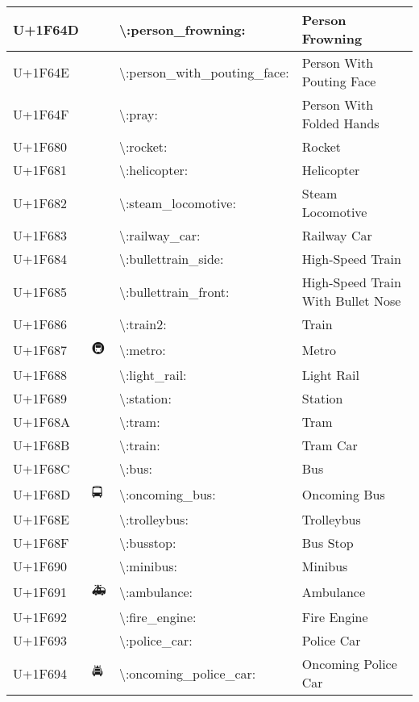 \begin{table}[h]
\begin{tabulary}{\linewidth}{|L|L|L|L|}
U+1F64D & 🙍 & {\textbackslash}:person\_frowning: & Person Frowning \\
\hline
U+1F64E & 🙎 & {\textbackslash}:person\_with\_pouting\_face: & Person With Pouting Face \\
\hline
U+1F64F & 🙏 & {\textbackslash}:pray: & Person With Folded Hands \\
\hline
U+1F680 & 🚀 & {\textbackslash}:rocket: & Rocket \\
\hline
U+1F681 & 🚁 & {\textbackslash}:helicopter: & Helicopter \\
\hline
U+1F682 & 🚂 & {\textbackslash}:steam\_locomotive: & Steam Locomotive \\
\hline
U+1F683 & 🚃 & {\textbackslash}:railway\_car: & Railway Car \\
\hline
U+1F684 & 🚄 & {\textbackslash}:bullettrain\_side: & High-Speed Train \\
\hline
U+1F685 & 🚅 & {\textbackslash}:bullettrain\_front: & High-Speed Train With Bullet Nose \\
\hline
U+1F686 & 🚆 & {\textbackslash}:train2: & Train \\
\hline
U+1F687 & 🚇 & {\textbackslash}:metro: & Metro \\
\hline
U+1F688 & 🚈 & {\textbackslash}:light\_rail: & Light Rail \\
\hline
U+1F689 & 🚉 & {\textbackslash}:station: & Station \\
\hline
U+1F68A & 🚊 & {\textbackslash}:tram: & Tram \\
\hline
U+1F68B & 🚋 & {\textbackslash}:train: & Tram Car \\
\hline
U+1F68C & 🚌 & {\textbackslash}:bus: & Bus \\
\hline
U+1F68D & 🚍 & {\textbackslash}:oncoming\_bus: & Oncoming Bus \\
\hline
U+1F68E & 🚎 & {\textbackslash}:trolleybus: & Trolleybus \\
\hline
U+1F68F & 🚏 & {\textbackslash}:busstop: & Bus Stop \\
\hline
U+1F690 & 🚐 & {\textbackslash}:minibus: & Minibus \\
\hline
U+1F691 & 🚑 & {\textbackslash}:ambulance: & Ambulance \\
\hline
U+1F692 & 🚒 & {\textbackslash}:fire\_engine: & Fire Engine \\
\hline
U+1F693 & 🚓 & {\textbackslash}:police\_car: & Police Car \\
\hline
U+1F694 & 🚔 & {\textbackslash}:oncoming\_police\_car: & Oncoming Police Car \\
\hline

\end{tabulary}
\end{table}
